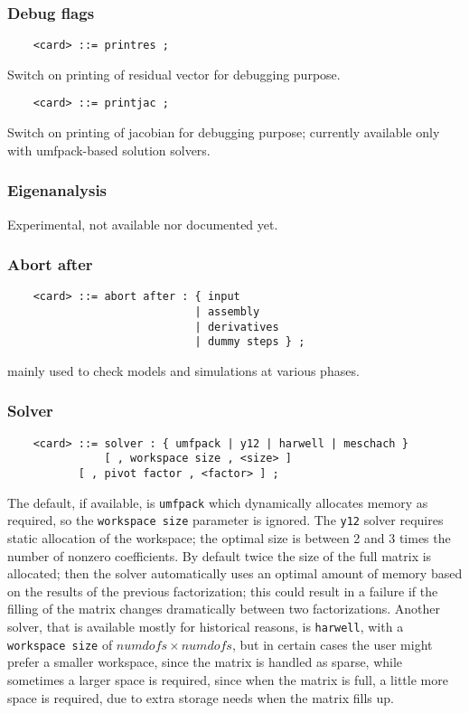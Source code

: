 \subsubsection{Debug flags}
\begin{verbatim}
    <card> ::= printres ;
\end{verbatim}
Switch on printing of residual vector for debugging purpose.
\begin{verbatim}
    <card> ::= printjac ;
\end{verbatim}
Switch on printing of jacobian for debugging purpose; 
currently available only with umfpack-based solution solvers.

\subsubsection{Eigenanalysis}
Experimental, not available nor documented yet.

\subsubsection{Abort after}
\begin{verbatim}
    <card> ::= abort after : { input 
                             | assembly 
                             | derivatives 
                             | dummy steps } ;
\end{verbatim}
mainly used to check models and simulations at various phases.

\subsubsection{Solver}   
\begin{verbatim}
    <card> ::= solver : { umfpack | y12 | harwell | meschach }
               [ , workspace size , <size> ] 
	       [ , pivot factor , <factor> ] ;
\end{verbatim}
The default, if available, is \texttt{umfpack} which dynamically
allocates memory as required, so the \texttt{workspace size} 
parameter is ignored.
The \texttt{y12} solver requires static allocation of the workspace;
the optimal size is between 2 and 3 times the number of nonzero 
coefficients.
By default twice the size of the full matrix is allocated;
then the solver automatically uses an optimal amount of memory
based on the results of the previous factorization; this could
result in a failure if the filling of the matrix changes 
dramatically between two factorizations.
Another solver, that is available mostly for historical reasons, 
is \texttt{harwell}, with a \texttt{workspace size}
of $ numdofs\times{numdofs} $, but in certain cases the user
might prefer a smaller workspace, since the matrix is handled as sparse,
while sometimes a larger space is required, since when the matrix is
full, a little more space is required, due to extra storage needs when
the matrix fills up.

